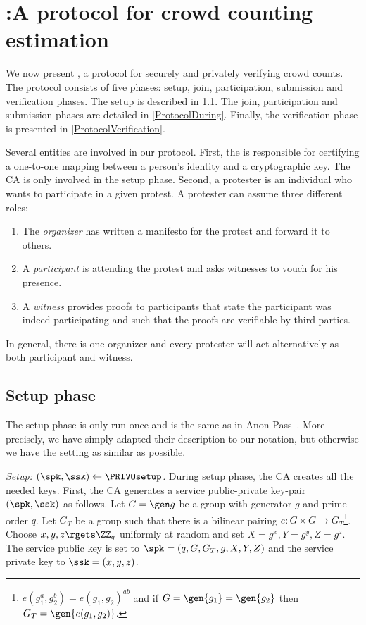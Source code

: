 \section{\PRIVO:\@ A protocol for crowd counting estimation}%
\label{Protocol}


We now present \PRIVO, a protocol for securely and privately verifying crowd counts.
The protocol consists of five phases: setup, join, participation, submission and verification phases.
The setup is described in \cref{ProtocolSetup}.
The join, participation and submission phases are detailed in \cref{ProtocolDuring}.
Finally, the verification phase is presented in \cref{ProtocolVerification}.

Several entities are involved in our protocol.
First, the  is responsible for certifying a one-to-one mapping between a person's identity and a cryptographic key.
The \ac{CA} is only involved in the setup phase.
Second, a protester is an individual who wants to participate in a given protest.
A protester can assume three different roles:
\begin{enumerate}
\item The \emph{organizer} has written a manifesto for the protest and forward it to others.
\item A \emph{participant} is attending the protest and asks witnesses to vouch for his presence.
\item A \emph{witness} provides proofs to participants that state the participant was indeed participating and such that the proofs are verifiable by third parties.
\end{enumerate}
In general, there is one organizer and every protester will act alternatively as both participant and witness.

\subsection{Setup phase}%
\label{ProtocolSetup}

The setup phase is only run once and is the same as in Anon-Pass~\cite{AnonPass}.
More precisely, we have simply adapted their description to our notation, but otherwise we have the setting as similar as possible.


\emph{Setup: \((\spk, \ssk)\gets \PRIVOsetup\).}
During setup phase, the \ac{CA} creates all the needed keys.
First, the \ac{CA} generates a service public-private key-pair \((\spk, \ssk)\) as follows.
Let \(G = \gen g\) be a group with generator \(g\) and prime order \(q\).
Let \(G_T\) be a group such that there is a bilinear pairing \(e\colon G\times G\to G_T\)\footnote{%
  \Ie \(e(g_1^a, g_2^b) = e(g_1, g_2)^{ab}\) and if \(G = \gen{g_1} = 
    \gen{g_2}\) then \(G_T = \gen{e(g_1, g_2)}\).
}.
Choose \(x,y,z\rgets \ZZ_q\) uniformly at random and set \(X = g^x, Y = g^y, Z = g^z\).
The service public key is set to \(\spk = (q, G, G_T, g, X, Y, Z)\) and the service private key to \(\ssk = (x, y, z)\).

